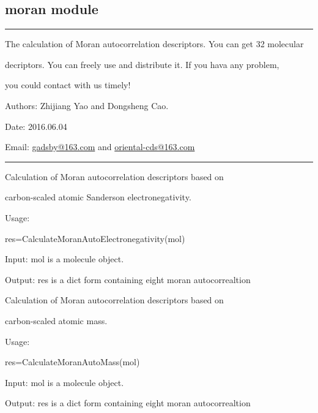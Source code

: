 \documentclass[letterpaper,10pt,english]{sphinxmanual}
\begin{document}
\subsection{moran module}
\label{reference/moran:moran-module}\label{reference/moran:module-moran}\label{reference/moran::doc}

\bigskip\hrule{}\bigskip


The calculation of Moran autocorrelation descriptors. You can get 32 molecular

decriptors. You can freely use and distribute it. If you hava  any problem,

you could contact with us timely!

Authors: Zhijiang Yao and Dongsheng Cao.

Date: 2016.06.04

Email: \href{mailto:gadsby@163.com}{gadsby@163.com} and \href{mailto:oriental-cds@163.com}{oriental-cds@163.com}


\bigskip\hrule{}\bigskip


\begin{fulllineitems}
\label{reference/moran:moran.CalculateMoranAutoElectronegativity}
Calculation of Moran autocorrelation descriptors based on

carbon-scaled atomic Sanderson electronegativity.

Usage:

res=CalculateMoranAutoElectronegativity(mol)

Input: mol is a molecule object.

Output: res is a dict form containing eight moran autocorrealtion

\end{fulllineitems}


\begin{fulllineitems}
\label{reference/moran:moran.CalculateMoranAutoMass}
Calculation of Moran autocorrelation descriptors based on

carbon-scaled atomic mass.

Usage:

res=CalculateMoranAutoMass(mol)

Input: mol is a molecule object.

Output: res is a dict form containing eight moran autocorrealtion

\end{fulllineitems}
\end{document}
